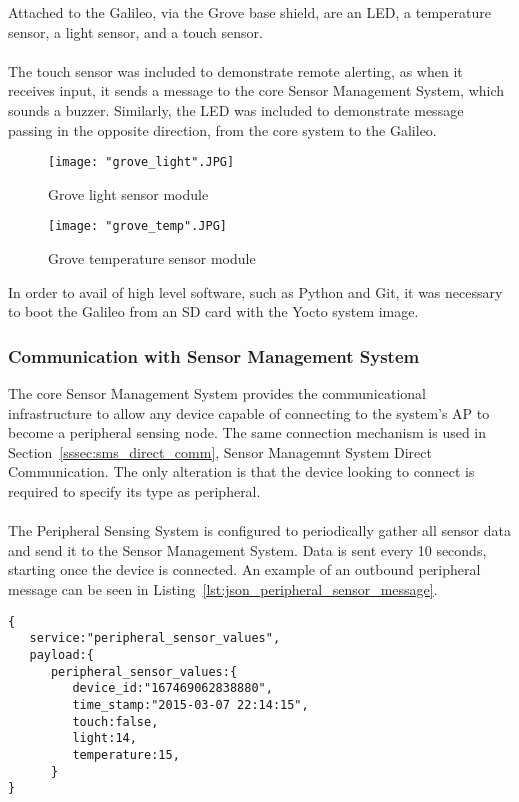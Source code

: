 \documentclass{article}
\begin{document}
\noindent
Attached to the Galileo, via the Grove base shield, are an LED, a temperature sensor, a light sensor, and a touch sensor.\\\\
The touch sensor was included to demonstrate remote alerting, as when it receives input, it sends a message to the core Sensor Management System, which sounds a buzzer. Similarly, the LED was included to demonstrate message passing in the opposite direction, from the core system to the Galileo. 

\begin{figure}[H]
\centering
\texttt{[image: "grove\_light".JPG]}
\caption{Grove light sensor module}
\label{fig:hard_grove_light}
\end{figure}

\begin{figure}[H]
\centering
\texttt{[image: "grove\_temp".JPG]}
\caption{Grove temperature sensor module}
\label{fig:hard_grove_light}
\end{figure}

\noindent
In order to avail of high level software, such as Python and Git, it was necessary to boot the Galileo from an SD card with the Yocto system image.
\newpage
\subsubsection{Communication with Sensor Management System}
The core Sensor Management System provides the communicational infrastructure to allow any device capable of connecting to the system\rq s AP to become a peripheral sensing node. The same connection mechanism is used in Section~\ref{sssec:sms_direct_comm}, Sensor Managemnt System Direct Communication. The only alteration is that the device looking to connect is required to specify its type as peripheral. \\\\
The Peripheral Sensing System is configured to periodically gather all sensor data and send it to the Sensor Management System. Data is sent every 10 seconds, starting once the device is connected. An example of an outbound peripheral message can be seen in Listing~\ref{lst:json_peripheral_sensor_message}.

\begin{lstlisting}[caption={JSON peripheral sensor readings message object},label={lst:json_peripheral_sensor_message}]
{  
   service:"peripheral_sensor_values",
   payload:{  
      peripheral_sensor_values:{  
      	 device_id:"167469062838880",
         time_stamp:"2015-03-07 22:14:15",
         touch:false,
         light:14,
         temperature:15,
      }
}
\end{lstlisting}
\end{document}
